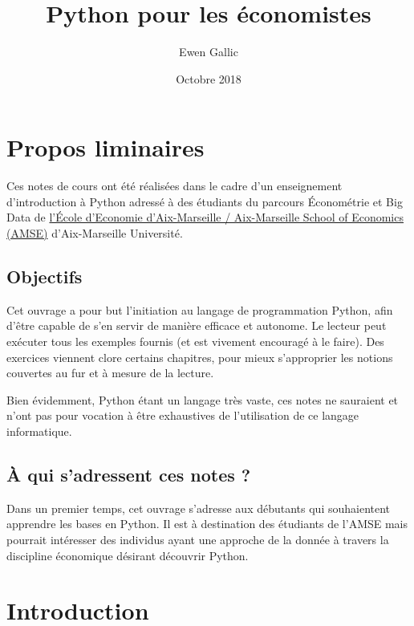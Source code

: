 \documentclass[12pt,]{book}
\title{Python pour les économistes}
\author{Ewen Gallic}
\date{Octobre 2018}
\numberwithin{equation}{section}
\numberwithin{countremarque}{section}
\newcounter{exercices}[section]
\begin{document}
\maketitle

{
\hypersetup{linkcolor=black}
\setcounter{tocdepth}{1}
\tableofcontents
}
\listoftables
\listoffigures
\chapter*{Propos liminaires}\label{propos-liminaires}

Ces notes de cours ont été réalisées dans le cadre d'un enseignement
d'introduction à Python adressé à des étudiants du parcours Économétrie
et Big Data de \href{https://www.amse-aixmarseille.fr/}{l'École
d'Economie d'Aix-Marseille / Aix-Marseille School of Economics (AMSE)}
d'Aix-Marseille Université.

\section{Objectifs}\label{objectifs}

Cet ouvrage a pour but l'initiation au langage de programmation Python,
afin d'être capable de s'en servir de manière efficace et autonome. Le
lecteur peut exécuter tous les exemples fournis (et est vivement
encouragé à le faire). Des exercices viennent clore certains chapitres,
pour mieux s'approprier les notions couvertes au fur et à mesure de la
lecture.

Bien évidemment, Python étant un langage très vaste, ces notes ne
sauraient et n'ont pas pour vocation à être exhaustives de l'utilisation
de ce langage informatique.

\section{À qui s'adressent ces notes
?}\label{a-qui-sadressent-ces-notes}

Dans un premier temps, cet ouvrage s'adresse aux débutants qui
souhaientent apprendre les bases en Python. Il est à destination des
étudiants de l'AMSE mais pourrait intéresser des individus ayant une
approche de la donnée à travers la discipline économique désirant
découvrir Python.

\chapter{Introduction}\label{introduction}
\end{document}
